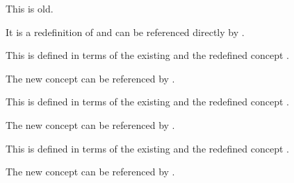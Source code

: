 \documentclass[minimal]{omdoc}
\begin{document}
\begin{module}[id=dfoo]
\begin{definition}[id=dtest.one]
  This  is old.
\end{definition}
It is a redefinition of  and can be referenced directly by
.

\begin{definition}
  This  is defined in terms of the existing
   and the redefined concept .
\end{definition}
The new concept can be referenced by .

\begin{definition}
  This  is defined in terms of the existing
   and the redefined concept .
\end{definition}
The new concept can be referenced by .

\begin{definition}
  This  is defined in
  terms of the existing  and the
  redefined concept .
\end{definition}
The new concept can be referenced by .
\end{module}
\end{document}
